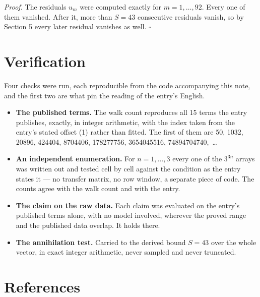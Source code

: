 \documentclass[11pt]{article}
\theoremstyle{definition}
\begin{document}
{\itshape Proof.} The residuals $u_m$ were computed exactly for $m = 1,\dots,92$. Every one of them vanished. After it, more than $S = 43$ consecutive residuals vanish, so by Section 5 every later residual vanishes as well. $\square$

\section{Verification}

Four checks were run, each reproducible from the code accompanying this note, and the first two are what pin the reading of the entry's English.

\begin{itemize}

\item {\bfseries The published terms.} The walk count reproduces all 15 terms the entry publishes, exactly, in integer arithmetic, with the index taken from the entry's stated offset (1) rather than fitted. The first of them are 50, 1032, 20896, 424404, 8704406, 178277756, 3654045516, 74894704740,~\dots

\item {\bfseries An independent enumeration.} For $n = 1,\dots,3$ every one of the $3^{3n}$ arrays was written out and tested cell by cell against the condition as the entry states it --- no transfer matrix, no row window, a separate piece of code. The counts agree with the walk count and with the entry.

\item {\bfseries The claim on the raw data.} Each claim was evaluated on the entry's published terms alone, with no model involved, wherever the proved range and the published data overlap. It holds there.

\item {\bfseries The annihilation test.} Carried to the derived bound $S = 43$ over the whole vector, in exact integer arithmetic, never sampled and never truncated.

\end{itemize}

\section{References}
\end{document}
